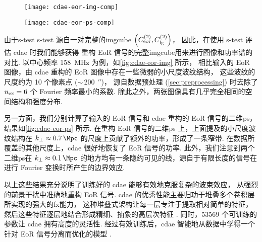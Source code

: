 \begin{figure}[htp]
  \centering
  \texttt{[image: cdae-eor-img-comp]}
  \label{fig:cdae-eor-img}
\end{figure}

\begin{figure}[htp]
  \centering
  \texttt{[image: cdae-eor-ps-comp]}
  \label{fig:cdae-eor-ps}
\end{figure}

由于\acl{s-test} \ac{s-test} 源自一对完整的\ac{imgcube}
$\left( C_{\mathrm{eor}}^{(2)}, C_{\mathrm{fg}}^{(2)} \right)$，
因此，在使用 \ac{s-test} 评估 \ac{cdae} 时我们能够获得
重构 EoR 信号的完整\ac{imgcube}用来进行图像和功率谱的对比.
以中心频率 \SI{158}{\MHz} 为例，如\autoref{fig:cdae-eor-img} 所示，
相比输入的 EoR 图像，由 \ac{cdae} 重构的 EoR 图像中存在一些微弱的小尺度波纹结构，
这些波纹的尺度约为 10 个像素点 ($\sim$\,\SI{200}{\arcsecond})，
源自数据预处理 (\autoref{sec:preprocessing}) 时去除了 $n_{\mathrm{ex}} = 6$
个 Fourier 频率最小的系数.
除此之外，两张图像具有几乎完全相同的空间结构和强度分布.

另一方面，我们分别计算了输入的 EoR 信号和 \ac{cdae} 重构的 EoR 信号的二维\ac{ps}，
结果如\autoref{fig:cdae-eor-ps} 所示.
在重构 EoR 信号的二维\ac{ps} 上，上面提及的小尺度波纹结构在
$\kperp \approx \SI{0.7}{\per\Mpc}$ 的尺度上贡献了额外的功率，形成了一条窄带.
在数据所覆盖的其他尺度上，\ac{cdae} 很好地恢复了 EoR 信号的功率.
此外，我们注意到两个二维\ac{ps}在 $\kperp \approx \SI{0.1}{\per\Mpc}$
的地方均有一条隐约可见的线，源自于有限长度的信号在进行 Fourier 变换时所产生的边界效应.

以上这些结果充分说明了训练好的 \ac{cdae} 能够有效地克服复杂的波束效应，
从强烈的前景干扰中准确地重构 EoR 信号.
\ac{cdae} 的优秀性能主要归功于堆叠多个卷积层所实现的强大的\ac{fx}能力，
这种堆叠式架构让每一层专注于提取相对简单的特征，
然后这些特征逐层地结合形成精细、抽象的高层次特征 \cite{leCun2015}.
同时，\num{53569} 个可训练的参数让 \ac{cdae} 拥有高度的灵活性.
经过有效训练后，\ac{cdae} 智能地从数据中学得一个针对 EoR 信号分离而优化的模型
\cite{domingos2012}.

